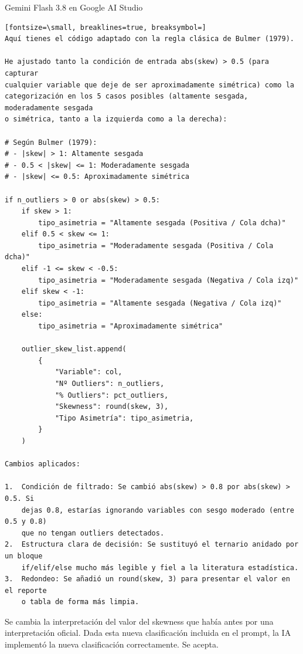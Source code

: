 \documentclass[12pt,a4paper,oneside]{book}
\begin{document}
\begin{iaresp}{Gemini Flash 3.8 en Google AI Studio}
\begin{Verbatim}[fontsize=\small, breaklines=true, breaksymbol=]
Aquí tienes el código adaptado con la regla clásica de Bulmer (1979).

He ajustado tanto la condición de entrada abs(skew) > 0.5 (para capturar
cualquier variable que deje de ser aproximadamente simétrica) como la
categorización en los 5 casos posibles (altamente sesgada, moderadamente sesgada
o simétrica, tanto a la izquierda como a la derecha):

# Según Bulmer (1979):
# - |skew| > 1: Altamente sesgada
# - 0.5 < |skew| <= 1: Moderadamente sesgada
# - |skew| <= 0.5: Aproximadamente simétrica

if n_outliers > 0 or abs(skew) > 0.5:
    if skew > 1:
        tipo_asimetria = "Altamente sesgada (Positiva / Cola dcha)"
    elif 0.5 < skew <= 1:
        tipo_asimetria = "Moderadamente sesgada (Positiva / Cola dcha)"
    elif -1 <= skew < -0.5:
        tipo_asimetria = "Moderadamente sesgada (Negativa / Cola izq)"
    elif skew < -1:
        tipo_asimetria = "Altamente sesgada (Negativa / Cola izq)"
    else:
        tipo_asimetria = "Aproximadamente simétrica"

    outlier_skew_list.append(
        {
            "Variable": col,
            "Nº Outliers": n_outliers,
            "% Outliers": pct_outliers,
            "Skewness": round(skew, 3),
            "Tipo Asimetría": tipo_asimetria,
        }
    )

Cambios aplicados:

1.  Condición de filtrado: Se cambió abs(skew) > 0.8 por abs(skew) > 0.5. Si
    dejas 0.8, estarías ignorando variables con sesgo moderado (entre 0.5 y 0.8)
    que no tengan outliers detectados.
2.  Estructura clara de decisión: Se sustituyó el ternario anidado por un bloque
    if/elif/else mucho más legible y fiel a la literatura estadística.
3.  Redondeo: Se añadió un round(skew, 3) para presentar el valor en el reporte
    o tabla de forma más limpia.
\end{Verbatim}
\end{iaresp}
\begin{iaanalisis}
Se cambia la interpretación del valor del skewness que había antes por una interpretación oficial. Dada esta nueva clasificación incluida en el prompt, la IA implementó la nueva clasificación correctamente. Se acepta.
\end{iaanalisis}
\end{document}
